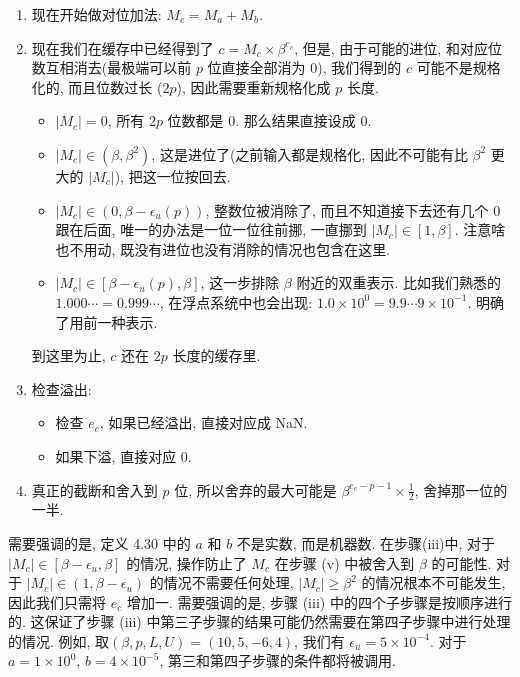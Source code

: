 \documentclass[a4paper]{ctexart}
\begin{document}
{\begin{enumerate}
\begin{itemize}
  \end{itemize}
\item 现在开始做对位加法: $M_c = M_a + M_b$. 
\item 现在我们在缓存中已经得到了 $c = M_c \times \beta^{e_c}$,
  但是, 由于可能的进位, 和对应位数互相消去(最极端可以前 $p$ 位直接全部消为 $0$),
  我们得到的 $c$ 可能不是规格化的, 而且位数过长 ($2 p$),
  因此需要重新规格化成 $p$ 长度.
  \begin{itemize}
  \item $|M_c| = 0$, 所有 $2 p$ 位数都是 $0$. 那么结果直接设成 $0$.
  \item $|M_c| \in (\beta, \beta^2)$, 这是进位了(之前输入都是规格化,
    因此不可能有比 $\beta^2$ 更大的 $|M_c|$), 把这一位按回去.
  \item $|M_c| \in (0, \beta - \epsilon_u(p))$, 整数位被消除了,
    而且不知道接下去还有几个 $0$ 跟在后面, 唯一的办法是一位一位往前挪,
    一直挪到 $|M_c| \in [1, \beta]$.
    注意啥也不用动, 既没有进位也没有消除的情况也包含在这里. 
  \item $|M_c| \in [\beta - \epsilon_u(p), \beta]$, 这一步排除 $\beta$
    附近的双重表示. 比如我们熟悉的 $1.000 \cdots = 0.999 \cdots$,
    在浮点系统中也会出现: $1.0 \times 10^0 = 9.9\cdots 9 \times 10^{-1}$.
    明确了用前一种表示.
  \end{itemize}
  到这里为止, $c$ 还在 $2 p$ 长度的缓存里. 
\item 检查溢出:
  \begin{itemize}
  \item 检查 $e_c$, 如果已经溢出, 直接对应成 NaN.
  \item 如果下溢, 直接对应 $0$.
  \end{itemize}
\item 真正的截断和舍入到 $p$ 位,
  所以舍弃的最大可能是 $\beta^{e_c - p - 1} \times \frac{1}{2}$,
  舍掉那一位的一半.
\end{enumerate}

\begin{remark}
  需要强调的是, 定义 4.30 中的 $a$ 和 $b$ 不是实数, 而是机器数. 在步骤(iii)中, 
  对于 $|M_c | \in [\beta - \epsilon_u, \beta]$ 的情况, 操作防止了
  $M_c$ 在步骤 (v) 中被舍入到 $\beta$ 的可能性. 对于 $|M_c| \in (1, \beta - \epsilon_u)$ 
  的情况不需要任何处理, $|M_c | \geq \beta^2$ 的情况根本不可能发生, 
  因此我们只需将 $e_c$ 增加一. 需要强调的是, 步骤 (iii) 中的四个子步骤是按顺序进行的. 
  这保证了步骤 (iii) 中第三子步骤的结果可能仍然需要在第四子步骤中进行处理的情况. 
  例如, 取$(\beta, p, L, U ) = (10, 5, -6, 4)$, 我们有
  $\epsilon_u = 5 \times 10^{-4}$. 对于$a = 1 \times 10^0$, 
  $b = 4 \times 10^{-5}$, 第三和第四子步骤的条件都将被调用.
\end{remark}


}
\end{document}
